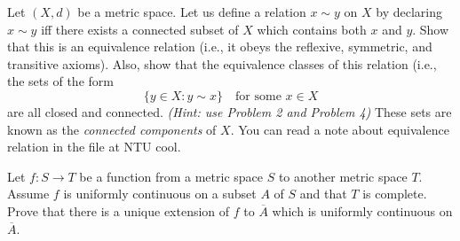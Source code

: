 \begin{problem}[20pts]
    Let $(X,d)$ be a metric space. Let us define a relation $x \sim y$ on $X$ by declaring  
$x \sim y$ iff there exists a connected subset of $X$ which contains both $x$ and $y$.  
Show that this is an equivalence relation (i.e., it obeys the reflexive, symmetric, and transitive axioms).  
Also, show that the equivalence classes of this relation (i.e., the sets of the form  
\[
\{ y \in X : y \sim x \} \quad \text{for some } x \in X
\]  
are all closed and connected.  
\emph{(Hint: use Problem 2 and Problem 4)}  
These sets are known as the \emph{connected components} of $X$.
You can read a note about equivalence relation in the file at NTU cool.
\end{problem}
\begin{problem}[15pts]
    Let $f : S \to T$ be a function from a metric space $S$ to another metric space $T$.  
Assume $f$ is uniformly continuous on a subset $A$ of $S$ and that $T$ is complete.  
Prove that there is a unique extension of $f$ to $\overline{A}$ which is uniformly continuous on $\overline{A}$.
\end{problem}